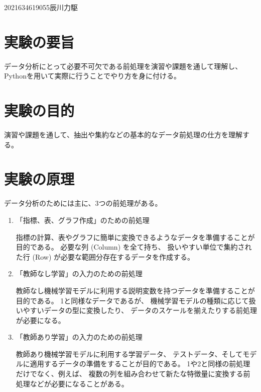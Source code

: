 \documentclass[12pt]{jarticle}
\begin{document}
{2021}{6}{3}{4619055}{辰川力駆}
\section{実験の要旨}
データ分析にとって必要不可欠である前処理を演習や課題を通して理解し、
Pythonを用いて実際に行うことでやり方を身に付ける。

\section{実験の目的}
演習や課題を通して、抽出や集約などの基本的なデータ前処理の仕方を理解する。

\section{実験の原理}
データ分析のためには主に、3つの前処理がある。
\begin{enumerate}
    \item 「指標、表、グラフ作成」のための前処理

          指標の計算、表やグラフに簡単に変換できるようなデータを準備することが目的である。
          必要な列 (Column) を全て持ち、
          扱いやすい単位で集約された行 (Row) が必要な範囲分存在するデータを作成する。
    \item 「教師なし学習」の入力のための前処理

          教師なし機械学習モデルに利用する説明変数を持つデータを準備することが目的である。
          1と同様なデータであるが、
          機械学習モデルの種類に応じて扱いやすいデータの型に変換したり、
          データのスケールを揃えたりする前処理が必要になる。
    \item 「教師あり学習」の入力のための前処理

          教師あり機械学習モデルに利用する学習データ、
          テストデータ、そしてモデルに適用するデータの準備をすることが目的である。
          1や2と同様の前処理だけでなく、例えば、
          複数の列を組み合わせて新たな特徴量に変換する前処理などが必要になることがある。

\end{enumerate}
\end{document}
